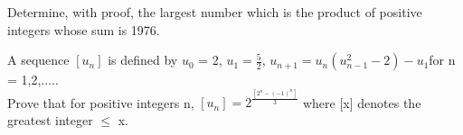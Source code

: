 \item Determine, with proof, the largest number which is the product of positive integers whose sum is 1976.
\item A sequence $[u_n]$ is defined by $u_0$ = 2, $u_1 = \frac{5}{2}$, $u_{n+1} = u_n(u_{n-1}^2 - 2) - u_1$for n = 1,2,.....\\
Prove that for positive integers n, $[u_n] = 2^\frac{[2^{n}-(-1)^{n}]}{3}$
where [x] denotes the greatest integer $\leq$ x.


